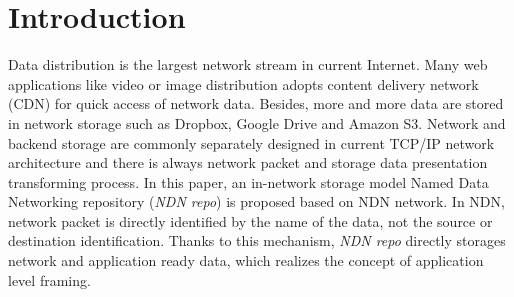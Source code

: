 \documentclass[conference]{IEEEtran}
\begin{document}




\maketitle


\begin{abstract}

\end{abstract}





%
\IEEEpeerreviewmaketitle

\section{Introduction}

Data distribution is the largest network stream in current Internet. Many web applications like video or image distribution adopts content delivery network (CDN) for quick access of network data. Besides, more and more data are stored in network storage such as Dropbox, Google Drive and Amazon S3. Network and backend storage are commonly separately designed in current TCP/IP network architecture and there is always network packet and storage data presentation transforming process. In this paper, an in-network storage model Named Data Networking repository (\emph{NDN repo}) is proposed based on NDN network. In NDN, network packet is directly identified by the name of the data, not the source or destination identification. Thanks to this mechanism, \emph{NDN repo} directly storages network and application ready data, which realizes the concept of application level framing. \cite{clark1990architectural}
\end{document}

